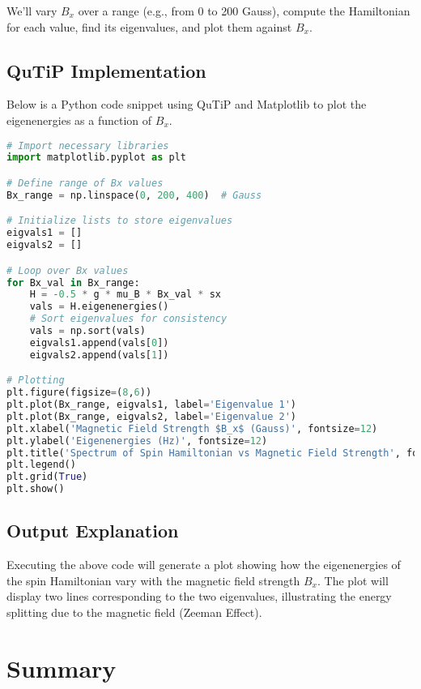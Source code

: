 \documentclass[12pt]{article}
\begin{document}
We'll vary \( B_x \) over a range (e.g., from 0 to 200 Gauss), compute the Hamiltonian for each value, find its eigenvalues, and plot them against \( B_x \).

\subsection{QuTiP Implementation}

Below is a Python code snippet using QuTiP and Matplotlib to plot the eigenenergies as a function of \( B_x \).

\begin{lstlisting}[language=Python, caption=Plotting the Spectrum vs. Magnetic Field Strength in QuTiP]
# Import necessary libraries
import matplotlib.pyplot as plt

# Define range of Bx values
Bx_range = np.linspace(0, 200, 400)  # Gauss

# Initialize lists to store eigenvalues
eigvals1 = []
eigvals2 = []

# Loop over Bx values
for Bx_val in Bx_range:
    H = -0.5 * g * mu_B * Bx_val * sx
    vals = H.eigenenergies()
    # Sort eigenvalues for consistency
    vals = np.sort(vals)
    eigvals1.append(vals[0])
    eigvals2.append(vals[1])

# Plotting
plt.figure(figsize=(8,6))
plt.plot(Bx_range, eigvals1, label='Eigenvalue 1')
plt.plot(Bx_range, eigvals2, label='Eigenvalue 2')
plt.xlabel('Magnetic Field Strength $B_x$ (Gauss)', fontsize=12)
plt.ylabel('Eigenenergies (Hz)', fontsize=12)
plt.title('Spectrum of Spin Hamiltonian vs Magnetic Field Strength', fontsize=14)
plt.legend()
plt.grid(True)
plt.show()
\end{lstlisting}

\subsection{Output Explanation}

Executing the above code will generate a plot showing how the eigenenergies of the spin Hamiltonian vary with the magnetic field strength \( B_x \). The plot will display two lines corresponding to the two eigenvalues, illustrating the energy splitting due to the magnetic field (Zeeman Effect).

\newpage

\section{Summary}
\end{document}
